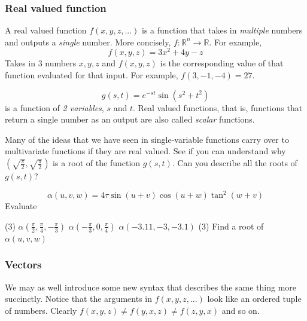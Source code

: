 \documentclass[14pt]{article}
\begin{document}
	\subsubsection{Real valued function} 
	A real valued function $f(x, y, z, ...)$ is a function that takes in \textit{multiple} numbers and outputs a \textit{single} number. More concisely, $ f: \mathbb{R}^n \rightarrow \mathbb{R}$. For example,
	\begin{equation*}
		f(x, y, z) = 3x^2 + 4y - z
	\end{equation*}
	Takes in 3 numbers $x, y, z$ and $f(x, y, z)$ is the corresponding value of that function evaluated for that input. For example, $f(3, -1, -4) = 27$.
	
	\begin{equation*}
		g(s, t) = e^{-st}\sin(s^2 + t^2)
	\end{equation*}
	is a function of \textit{2 variables}, $s$ and $t$. Real valued functions, that is, functions that return a single number as an output are also called \textit{scalar} functions. 
	
	Many of the ideas that we have seen in single-variable functions carry over to multivariate functions if they are real valued. See if you can understand why $\left( \sqrt{\frac{\pi}{2}}, \sqrt{\frac{\pi}{2}}\right) $ is a root of the function $g(s, t)$. Can you describe all the roots of $g(s, t)$?
	
	\begin{question}[unbreakable]{}{}
		\begin{equation*}
			\alpha(u, v, w) = 4\tau \sin(u+v)\cos(u+w)\tan^2(w+v)
		\end{equation*}
	Evaluate 
	\begin{tasks}(3)
		\task $\alpha\left( \frac{\pi}{2}, \frac{\pi}{4}, -\frac{\pi}{3}\right)$
		\task $\alpha\left(-\frac{\pi}{3},             0,  \frac{\pi}{4}\right)$
		\task $\alpha\left( -3.11, -3, -3.1\right)$
		\task*(3) Find a root of $\alpha(u, v, w)$
	\end{tasks}
	\end{question}
	
	\subsubsection{Vectors} 
	We may as well introduce some new syntax that describes the same thing more succinctly. Notice that the arguments in $f(x, y, z, ...)$ look like an ordered tuple of numbers. Clearly $f(x, y, z) \neq f(y, x, z) \neq f(z, y, x)$ and so on. 
	
\end{document}
